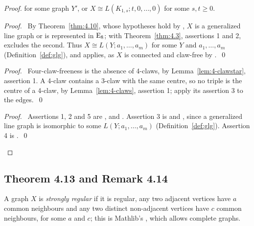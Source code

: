 \begin{proof}
{{  for some graph $Y'$, or $X\cong L(K_{1,s};t,0,\dots,0)$ for some $s,t\ge0$.}}
 \begin{proof}\pf\ By Theorem~\ref{thm:4.10}, whose hypotheses hold by , $X$ is a
  generalized line graph or is represented in $\mathrm{E}_8$;  with Theorem~\ref{thm:4.3},
  assertions 1 and 2, excludes the second. Thus $X\cong L(Y;a_1,\dots,a_m)$ for some $Y$ and
  $a_1,\dots,a_m$ (Definition~\ref{def:glg}), and  applies, as $X$ is
  connected and claw-free by .~\qed\end{proof}
 \begin{proof}\pf\ Four-claw-freeness is the absence of 4-claws, by
  Lemma~\ref{lem:4-clawstar}, assertion 1. A 4-claw contains a 3-claw with the same centre, so
  no triple is the centre of a 4-claw, by Lemma~\ref{lem:4-claws}, assertion 1; apply its
  assertion 3 to the edges.~\qed\end{proof}
 \qedstep
 \begin{proof}\pf\ Assertions 1, 2 and 5 are ,  and
  . Assertion 3 is  and , since a
  generalized line graph is isomorphic to some $L(Y;a_1,\dots,a_m)$ (Definition~\ref{def:glg}).
  Assertion 4 is .~\qed\end{proof}
\end{proof}

\subsection{Theorem 4.13 and Remark 4.14}

A graph $X$ is \emph{strongly regular} if it is regular, any two adjacent vertices have
$a$ common neighbours and any two distinct non-adjacent vertices have $c$ common
neighbours, for some $a$ and $c$; this is Mathlib's , which
allows complete graphs.

